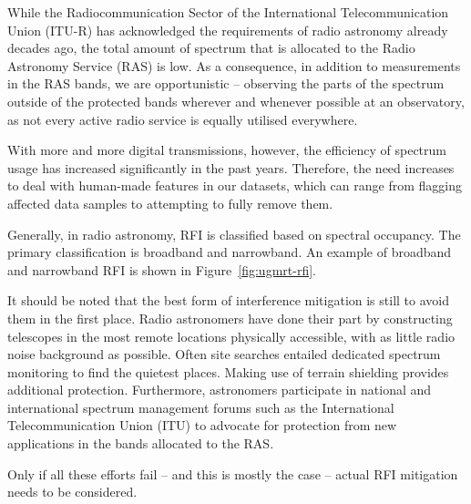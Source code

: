 While the Radiocommunication Sector of the International Telecommunication Union (ITU-R) has acknowledged the requirements of radio astronomy already decades ago, the total amount of spectrum that is allocated to the Radio Astronomy Service (RAS) is low. As a consequence, in addition to measurements in the RAS bands, we are opportunistic -- observing the parts of the spectrum outside of the protected bands wherever and whenever possible at an observatory, as not every active radio service is equally utilised everywhere. 

With more and more digital transmissions, however, the efficiency of spectrum usage has increased significantly in the past years. Therefore, the need increases to deal with human-made features in our datasets, which can range from flagging affected data samples to attempting to fully remove them.

Generally, in radio astronomy, RFI is classified based on spectral occupancy. The primary classification is broadband and narrowband. An example of broadband and narrowband RFI is shown in Figure~\ref{fig:ugmrt-rfi}.

It should be noted that the best form of interference mitigation is still to avoid them in the first place. Radio astronomers have done their part by constructing telescopes in the most remote locations physically accessible, with as little radio noise background as possible. Often site searches entailed dedicated spectrum monitoring to find the quietest places. Making use of terrain shielding provides additional protection. Furthermore, astronomers participate in national and international spectrum management forums such as the International Telecommunication Union (ITU) to advocate for protection from new applications in the bands allocated to the RAS.

Only if all these efforts fail -- and this is mostly the case -- actual RFI mitigation needs to be considered.


